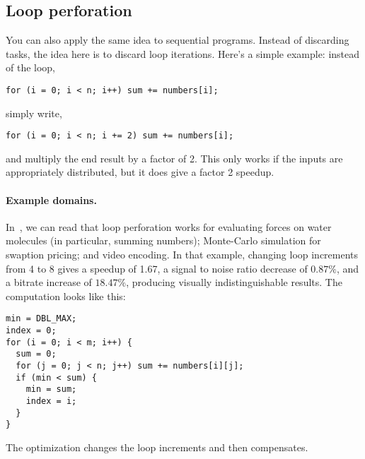 \subsection*{Loop perforation} 
You can also apply the same idea to sequential programs. Instead
of discarding tasks, the idea here is to discard loop iterations.
Here's a simple example: instead of the loop,
\begin{center}
\verb|for (i = 0; i < n; i++) sum += numbers[i];|
\end{center} \vspace*{-1em}
simply write,
\vspace*{-1em}\begin{center}
\verb|for (i = 0; i < n; i += 2) sum += numbers[i];|
\end{center}
and multiply the end result by a factor of 2. This only works 
if the inputs are appropriately distributed, but it does give a
factor 2 speedup.

\paragraph{Example domains.} In~\cite{Rinard:2010:PSA:1932682.1869525},
we can read that loop perforation works for evaluating forces on water
molecules (in particular, summing numbers); Monte-Carlo simulation for
swaption pricing; and video encoding. In that example, changing loop
increments from 4 to 8 gives a speedup of 1.67, a signal to noise ratio
decrease of $0.87\%$, and a bitrate increase of $18.47\%$, producing
visually indistinguishable results. The computation looks like this:

{\small
\begin{verbatim}
min = DBL_MAX;
index = 0;
for (i = 0; i < m; i++) {
  sum = 0;
  for (j = 0; j < n; j++) sum += numbers[i][j];
  if (min < sum) {
    min = sum;
    index = i;
  }
}
\end{verbatim}
}
The optimization changes the loop increments and then compensates. 





